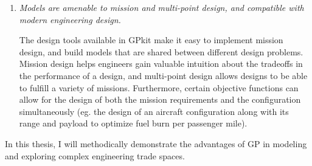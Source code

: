\begin{enumerate}
    \item \textit{Models are amenable to mission and multi-point design, and compatible with modern
    engineering design.}

The design tools available in GPkit make it easy to
implement mission design, and build models that are shared between
different design problems. Mission design helps engineers gain valuable intuition about
the tradeoffs in the performance of a design, and multi-point design allows designs to
be able to fulfill a variety of missions. Furthermore, certain objective functions can allow
    for the design of both the mission requirements and the configuration simultaneously (eg.
    the design of an aircraft configuration along with its range and payload to optimize
    fuel burn per passenger mile).

\end{enumerate}

In this thesis, I will methodically demonstrate the advantages of \gls{GP} in modeling
and exploring complex engineering trade spaces.



